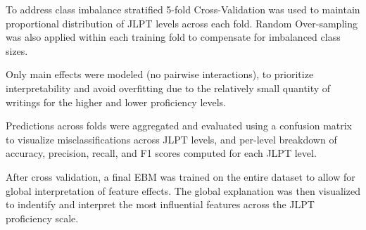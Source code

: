 To address class imbalance stratified 5-fold Cross-Validation was used to maintain proportional distribution of JLPT
levels across each fold. Random Over-sampling was also applied within each training fold to compensate for
imbalanced class sizes.

Only main effects were modeled (no pairwise interactions), to prioritize interpretability and avoid overfitting
due to the relatively small quantity of writings for the higher and lower proficiency levels.

Predictions across folds were aggregated and evaluated using a confusion matrix to visualize misclassifications
across JLPT levels, and per-level breakdown of accuracy, precision, recall, and F1 scores computed for each JLPT level.

After cross validation, a final EBM was trained on the entire dataset to allow for global interpretation of feature
effects. The global explanation was then visualized to indentify and interpret the most influential features across
the JLPT proficiency scale.




